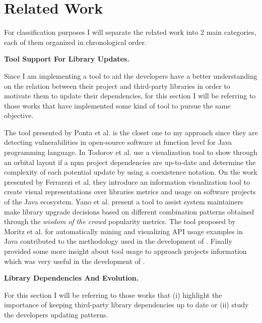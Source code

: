 \chapter{Related Work}
\label{sec:related_work}
For classification purposes I will separate the related work into 2 main categories, each of them organized in chronological order.

\vspace{5mm}
\textbf{Tool Support For Library Updates.}

Since I am implementing a tool to aid the developers have a better understanding on the relation between their project and third-party libraries in order to motivate them to update their dependencies, for this section I will be referring to those works that have implemented some kind of tool to pursue the same objective.

The tool presented by Ponta et al. \cite{Ponta:2018} is the closet one to my approach since they are detecting vulnerabilities in open-source software at function level for Java programming language. 
In \cite{todorov2017sol} Todorov et al. use a visualization tool to show through an orbital layout if a npm project dependencies are up-to-date and determine the complexity of each potential update by using a coexistence notation. 
On the work presented by Ferrarezi et al. \cite{ferrarezi2016libviews} they introduce an information visualization tool to create visual representations over libraries metrics and usage on software projects of the Java ecosystem. 
Yano et al. \cite{yano2015verxcombo} present a tool to assist system maintainers make library upgrade decisions based on different combination patterns obtained through the \textit{wisdom of the crowd} popularity metrics. 
The tool proposed by Moritz et al. \cite{moritz2013export} for automatically mining and visualizing API usage examples in Java contributed to the methodology used in the development of \tool.
Finally \cite{hora2015apiwave,dagenais2009semdiff,nguyen2010graph} provided some more insight about tool usage to approach projects information which was very useful in the development of \tool[].

\vspace{5mm}
\textbf{Library Dependencies And Evolution.}

For this section I will be referring to those works that (i) highlight the importance of keeping third-party library dependencies up to date or (ii) study the developers updating patterns.

